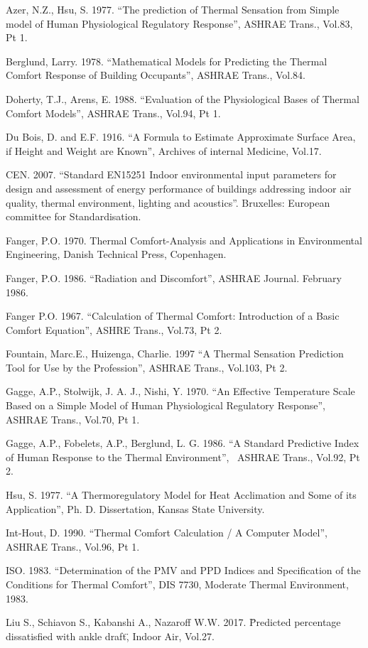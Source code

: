 Azer, N.Z., Hsu, S. 1977. ``The prediction of Thermal Sensation from Simple model of Human Physiological Regulatory Response'', ASHRAE Trans., Vol.83, Pt 1.

Berglund, Larry. 1978. ``Mathematical Models for Predicting the Thermal Comfort Response of Building Occupants'', ASHRAE Trans., Vol.84.

Doherty, T.J., Arens, E. 1988. ``Evaluation of the Physiological Bases of Thermal Comfort Models'', ASHRAE Trans., Vol.94, Pt 1.

Du Bois, D. and E.F. 1916. ``A Formula to Estimate Approximate Surface Area, if Height and Weight are Known'', Archives of internal Medicine, Vol.17.

CEN. 2007. ``Standard EN15251 Indoor environmental input parameters for design and assessment of energy performance of buildings addressing indoor air quality, thermal environment, lighting and acoustics''. Bruxelles: European committee for Standardisation.

Fanger, P.O. 1970. Thermal Comfort-Analysis and Applications in Environmental Engineering, Danish Technical Press, Copenhagen.

Fanger, P.O. 1986. ``Radiation and Discomfort'', ASHRAE Journal. February 1986.

Fanger P.O. 1967. ``Calculation of Thermal Comfort: Introduction of a Basic Comfort Equation'', ASHRE Trans., Vol.73, Pt 2.

Fountain, Marc.E., Huizenga, Charlie. 1997 ``A Thermal Sensation Prediction Tool for Use by the Profession'', ASHRAE Trans., Vol.103, Pt 2.

Gagge, A.P., Stolwijk, J. A. J., Nishi, Y. 1970. ``An Effective Temperature Scale Based on a Simple Model of Human Physiological Regulatory Response'', ASHRAE Trans., Vol.70, Pt 1.

Gagge, A.P., Fobelets, A.P., Berglund, L. G. 1986. ``A Standard Predictive Index of Human Response to the Thermal Environment'',~ ASHRAE Trans., Vol.92, Pt 2.

Hsu, S. 1977. ``A Thermoregulatory Model for Heat Acclimation and Some of its Application'', Ph. D. Dissertation, Kansas State University.

Int-Hout, D. 1990. ``Thermal Comfort Calculation / A Computer Model'', ASHRAE Trans., Vol.96, Pt 1.

ISO. 1983. ``Determination of the PMV and PPD Indices and Specification of the Conditions for Thermal Comfort'', DIS 7730, Moderate Thermal Environment, 1983.

Liu S., Schiavon S., Kabanshi A., Nazaroff W.W. 2017. \"Predicted percentage dissatisfied with ankle draft\", Indoor Air, Vol.27.
